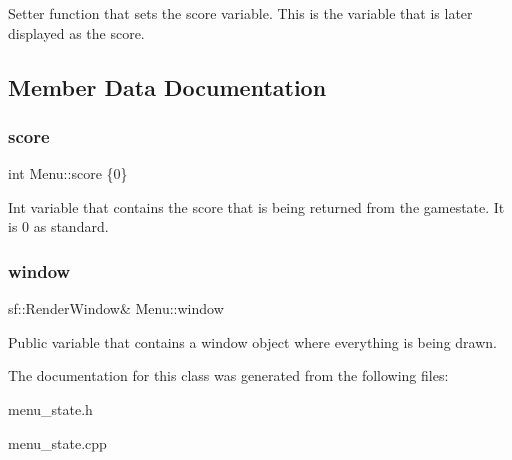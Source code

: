 Setter function that sets the score variable. This is the variable that is later displayed as the score. 

\subsection{Member Data Documentation}
\mbox{\label{classMenu_a7e426cd425c8d7e898c6b80e59339e5f}} 
\subsubsection{\texorpdfstring{score}{score}}
{\footnotesize\ttfamily int Menu\+::score \{0\}}

Int variable that contains the score that is being returned from the gamestate. It is 0 as standard. \mbox{\label{classMenu_a56a1907bf19e3ccdfbd31189c71fc18c}} 
\subsubsection{\texorpdfstring{window}{window}}
{\footnotesize\ttfamily sf\+::\+Render\+Window\& Menu\+::window}

Public variable that contains a window object where everything is being drawn. 

The documentation for this class was generated from the following files\+:\begin{DoxyCompactItemize}
\item 
menu\+\_\+state.\+h\item 
menu\+\_\+state.\+cpp\end{DoxyCompactItemize}
